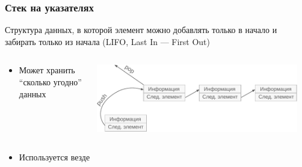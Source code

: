 \documentclass[aspectratio=169]{beamer}
\begin{document}
\begin{frame}
    \frametitle{Стек на указателях}
    Структура данных, в которой элемент можно добавлять только в начало и забирать только из начала (LIFO, Last In --- First Out)
    \begin{columns}
        \begin{small}
            \begin{column}{0.55\textwidth}
                \begin{itemize}
                    \item Может хранить \enquote{сколько угодно} данных
                          \begin{itemize}
                          \end{itemize}
                \end{itemize}
            \end{column}
        \end{small}
        \begin{column}{0.45\textwidth}
            \begin{center}
                \includegraphics[width=0.95\textwidth]{stack.pdf}
                \begin{tiny}
                \end{tiny}
            \end{center}
        \end{column}
    \end{columns}
    \begin{itemize}
        \item Используется везде
              \begin{itemize}

\end{itemize}
\end{itemize}
\end{frame}
\end{document}
